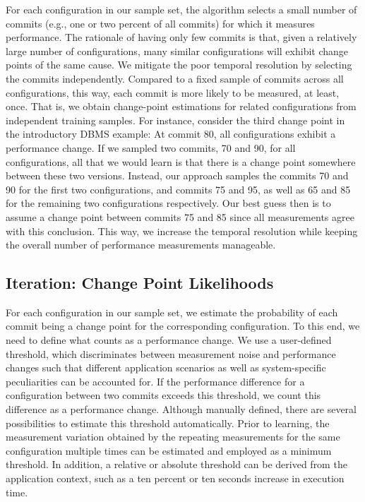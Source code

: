 \documentclass[sigconf]{acmart}
\begin{document}
	For each configuration in our sample set, the algorithm selects a small number of commits (e.g., one or two percent of all commits) for which it measures performance. 
	The rationale of having only few commits is that, given a relatively large number of configurations, many similar configurations will exhibit change points of the same cause. 
	We mitigate the poor temporal resolution by selecting the commits independently. 
	Compared to a fixed sample of commits across all configurations, this way, each commit is more likely to be measured, at least, once. That is, we obtain change-point estimations for related configurations from independent training samples. 
	For instance, consider the third change point in the introductory DBMS example: 
	At commit 80, all configurations exhibit a performance change. If we sampled two commits, 70 and 90, for all configurations, all that we would learn is that there is a change point somewhere between these two versions. 
	Instead, our approach samples the commits 70 and 90 for the first two configurations, and commits 75 and 95, as well as 65 and 85 for the remaining two configurations respectively. 
	Our best guess then is to assume a change point between commits 75 and 85 since all measurements agree with this conclusion. 
	This way, we increase the temporal resolution while keeping the overall number of performance measurements manageable.
	
	\subsection{Iteration: Change Point Likelihoods}\label{sec:changepointlikelihood}
	For each configuration in our sample set, we estimate the probability of each commit being a change point for the corresponding configuration.
	To this end, we need to define what counts as a performance change. We use a user-defined threshold, which discriminates between measurement noise and performance changes such that different application scenarios as well as system-specific peculiarities can be accounted for.
	If the performance difference for a configuration between two commits exceeds this threshold, we count this difference  as a performance change.
	Although manually defined, there are several possibilities to estimate this threshold automatically.
	Prior to learning, the measurement variation obtained by the repeating measurements for the same configuration multiple times can be estimated and employed as a minimum threshold.
	In addition, a relative or absolute threshold can be derived from the application context, such as a ten percent or ten seconds increase in execution time.
\end{document}
